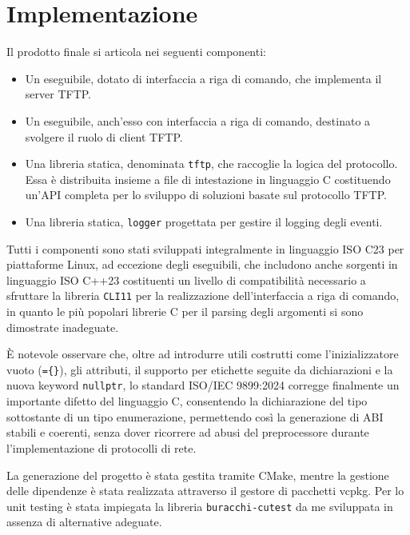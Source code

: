 \documentclass[12pt]{article}
\begin{document}
\section{Implementazione} {


Il prodotto finale si articola nei seguenti componenti:
\begin{itemize}
    \item Un eseguibile, dotato di interfaccia a riga di comando, che implementa il server TFTP.
    \item Un eseguibile, anch'esso con interfaccia a riga di comando, destinato a svolgere il ruolo di client TFTP.
    \item Una libreria statica, denominata \texttt{tftp}, che raccoglie la logica del protocollo. Essa è distribuita insieme a file di intestazione in linguaggio C costituendo un'API completa per lo sviluppo di soluzioni basate sul protocollo TFTP.
    \item Una libreria statica, \texttt{logger} progettata per gestire il logging degli eventi.
\end{itemize}

Tutti i componenti sono stati sviluppati integralmente in linguaggio ISO C23 per piattaforme Linux, ad eccezione degli eseguibili, che includono anche sorgenti in linguaggio ISO C++23 costituenti un livello di compatibilità necessario a sfruttare la libreria \texttt{CLI11} per la realizzazione dell'interfaccia a riga di comando, in quanto le più popolari librerie C per il parsing degli argomenti si sono dimostrate inadeguate.

È notevole osservare che, oltre ad introdurre utili costrutti come l'inizializzatore vuoto (\texttt{=\{\}}), gli attributi, il supporto per etichette seguite da dichiarazioni e la nuova keyword \texttt{nullptr}, lo standard ISO/IEC 9899:2024 corregge finalmente un importante difetto del linguaggio C, consentendo la dichiarazione del tipo sottostante di un tipo enumerazione, permettendo così la generazione di ABI stabili e coerenti, senza dover ricorrere ad abusi del preprocessore durante l'implementazione di protocolli di rete.

La generazione del progetto è stata gestita tramite CMake, mentre la gestione delle dipendenze è stata realizzata attraverso il gestore di pacchetti vcpkg.
Per lo unit testing è stata impiegata la libreria \texttt{buracchi-cutest} da me sviluppata in assenza di alternative adeguate.

}
\end{document}
